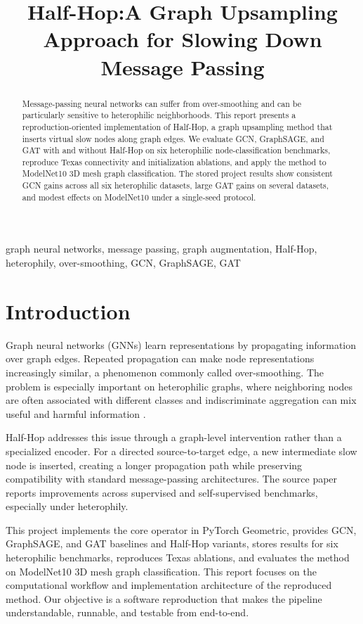 \documentclass[conference]{IEEEtran}
\title{Half-Hop:A Graph Upsampling Approach for Slowing Down Message Passing}
\author{\IEEEauthorblockN{Tejinderpal Singh (20245161), Yuvraj Rajput (202451139), Ramswarup Swami (202451141)}
\IEEEauthorblockA{Department of Information Technology\\
Indian Institute of Information Technology, Vadodara\\
Guided by Dr. Jignesh Patel}}
\begin{document}
\maketitle
\begin{abstract}
Message-passing neural networks can suffer from over-smoothing and can be particularly sensitive to heterophilic neighborhoods. This report presents a reproduction-oriented implementation of Half-Hop, a graph upsampling method that inserts virtual slow nodes along graph edges. We evaluate GCN, GraphSAGE, and GAT with and without Half-Hop on six heterophilic node-classification benchmarks, reproduce Texas connectivity and initialization ablations, and apply the method to ModelNet10 3D mesh graph classification. The stored project results show consistent GCN gains across all six heterophilic datasets, large GAT gains on several datasets, and modest effects on ModelNet10 under a single-seed protocol.
\end{abstract}
\begin{IEEEkeywords}
graph neural networks, message passing, graph augmentation, Half-Hop, heterophily, over-smoothing, GCN, GraphSAGE, GAT
\end{IEEEkeywords}

\section{Introduction}
Graph neural networks (GNNs) learn representations by propagating information over graph edges. Repeated propagation can make node representations increasingly similar, a phenomenon commonly called over-smoothing. The problem is especially important on heterophilic graphs, where neighboring nodes are often associated with different classes and indiscriminate aggregation can mix useful and harmful information \cite{pei}.

Half-Hop \cite{azabou} addresses this issue through a graph-level intervention rather than a specialized encoder. For a directed source-to-target edge, a new intermediate slow node is inserted, creating a longer propagation path while preserving compatibility with standard message-passing architectures. The source paper reports improvements across supervised and self-supervised benchmarks, especially under heterophily.

This project implements the core operator in PyTorch Geometric, provides GCN, GraphSAGE, and GAT baselines and Half-Hop variants, stores results for six heterophilic benchmarks, reproduces Texas ablations, and evaluates the method on ModelNet10 3D mesh graph classification. This report focuses on the computational workflow and implementation architecture of the reproduced method. Our objective is a software reproduction that makes the pipeline understandable, runnable, and testable from end-to-end.
\end{document}
